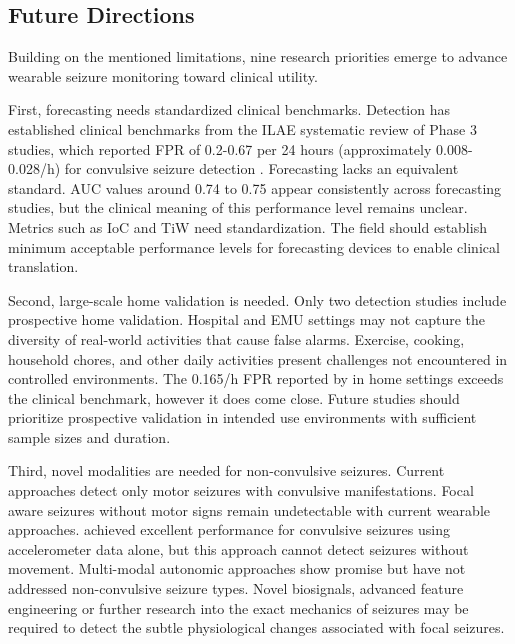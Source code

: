 \subsection{Future Directions}

Building on the mentioned limitations, nine research priorities emerge to advance wearable seizure monitoring toward clinical utility.

First, forecasting needs standardized clinical benchmarks. Detection has established clinical benchmarks from the ILAE systematic review of Phase 3 studies, which reported FPR of 0.2-0.67 per 24 hours (approximately 0.008-0.028/h) for convulsive seizure detection \parencite{beniczkyAutomatedSeizureDetection2021}. Forecasting lacks an equivalent standard. AUC values around 0.74 to 0.75 appear consistently across forecasting studies, but the clinical meaning of this performance level remains unclear. Metrics such as IoC and TiW need standardization. The field should establish minimum acceptable performance levels for forecasting devices to enable clinical translation.

Second, large-scale home validation is needed. Only two detection studies include prospective home validation. Hospital and EMU settings may not capture the diversity of real-world activities that cause false alarms. Exercise, cooking, household chores, and other daily activities present challenges not encountered in controlled environments. The 0.165/h FPR reported by \textcite{dongTwoLayerEnsembleMethod2022} in home settings exceeds the clinical benchmark, however it does come close. Future studies should prioritize prospective validation in intended use environments with sufficient sample sizes and duration.

Third, novel modalities are needed for non-convulsive seizures. Current approaches detect only motor seizures with convulsive manifestations. Focal aware seizures without motor signs remain undetectable with current wearable approaches. \textcite{spahrDeepLearningbasedDetection2025} achieved excellent performance for convulsive seizures using accelerometer data alone, but this approach cannot detect seizures without movement. Multi-modal autonomic approaches show promise but have not addressed non-convulsive seizure types. Novel biosignals, advanced feature engineering or further research into the exact mechanics of seizures may be required to detect the subtle physiological changes associated with focal seizures.

